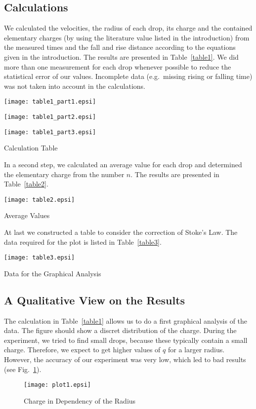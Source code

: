 \documentclass[a4paper,10pt]{article}
\begin{document}
\subsection{Calculations}
We calculated the velocities, the radius of each drop, its charge and the contained elementary charges (by using the literature value listed in the introduction) from the measured times and the fall and rise distance according to the equations given in the introduction. The results are presented in Table~\ref{table1}. We did more than one measurement for each drop whenever possible to reduce the statistical error of our values. Incomplete data (e.g.~missing rising or falling time) was not taken into account in the calculations.
\begin{table}[ht]
    \centering
    \texttt{[image: table1\_part1.epsi]}
\end{table}
\begin{table}[ht]
    \centering
    \texttt{[image: table1\_part2.epsi]}
\end{table}
\begin{table}[ht]
    \centering
    \texttt{[image: table1\_part3.epsi]}
    \caption{Calculation Table}
    \label{table1}
\end{table}

In a second step, we calculated an average value for each drop and determined the elementary charge from the number $n$. The results are presented in Table~\ref{table2}.
\begin{table}[ht]
    \centering
    \texttt{[image: table2.epsi]}
    \caption{Average Values}
    \label{table2}
\end{table}

At last we constructed a table to consider the correction of Stoke's Law. The data required for the plot is listed in Table~\ref{table3}.

\begin{table}[ht]
    \centering
    \texttt{[image: table3.epsi]}
    \caption{Data for the Graphical Analysis}
    \label{table3}
\end{table}
\clearpage

\subsection{A Qualitative View on the Results}
The calculation in Table~\ref{table1} allows us to do a first graphical analysis of the data. The figure should show a discret distribution of the charge. During the experiment, we tried to find small drops, because these typically contain a small charge. Therefore, we expect to get higher values of $q$ for a larger radius. However, the accuracy of our experiment was very low, which led to bad results (see Fig.~\ref{qualitative}).
\begin{figure}[ht]
    \centering
    \texttt{[image: plot1.epsi]}
    \caption{Charge in Dependency of the Radius}
    \label{qualitative}
\end{figure}
\end{document}
